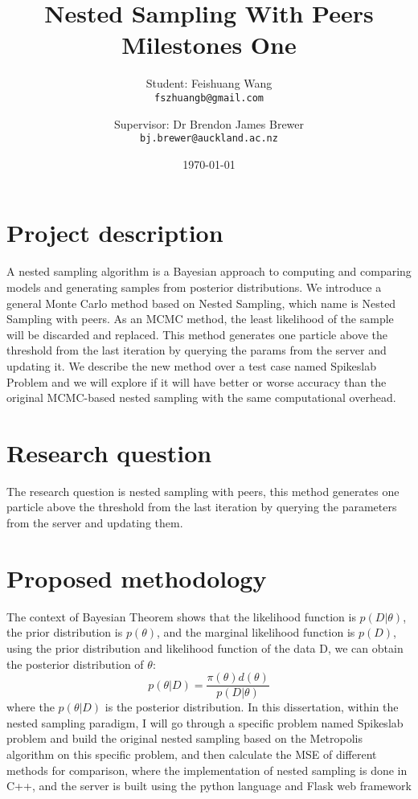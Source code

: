 \documentclass{article}
\title{Nested Sampling With Peers Milestones One}
\author{
  Student: Feishuang Wang\\
  \texttt{fszhuangb@gmail.com}
  \and
  Supervisor: Dr Brendon James Brewer\\
  \texttt{bj.brewer@auckland.ac.nz}
}
\date{\today}
\begin{document}
\maketitle

\section{Project description}
A nested sampling algorithm is a Bayesian approach to computing and comparing models and generating samples from posterior distributions. We introduce a general Monte Carlo method based on Nested Sampling, which name is Nested Sampling with peers. As an MCMC method, the least likelihood of the sample will be discarded and replaced. This method generates one particle above the threshold from the last iteration by querying the params from the server and updating it. We describe the new method over a test case named Spikeslab Problem and we will explore if it will have better or worse accuracy than the original MCMC-based nested sampling with the same computational overhead.
\section{Research question}
The research question is nested sampling with peers,  this method generates one particle above the threshold from the last iteration by querying the parameters from the server and updating them. 
\section{Proposed methodology}
The context of Bayesian Theorem shows that the likelihood function is $p(D|\theta)$, the prior distribution is 
$p(\theta)$, and the marginal likelihood function is $p(D)$, using the prior distribution and
likelihood function of the data D, we can obtain the posterior distribution of $\theta$:
\begin{equation}
    p(\theta|D) = \frac{\pi(\theta)d(\theta)}{p(D|\theta)}
\end{equation}
where the $p(\theta|D)$ is the posterior distribution.
In this dissertation, within the nested sampling paradigm, 
I will go through a specific problem named Spikeslab problem and build the original nested sampling based on the Metropolis algorithm on this specific problem,
and then calculate the MSE of different methods for comparison, where the implementation of nested sampling is done in C++, 
and the server is built using the python language and Flask web framework
\end{document}
